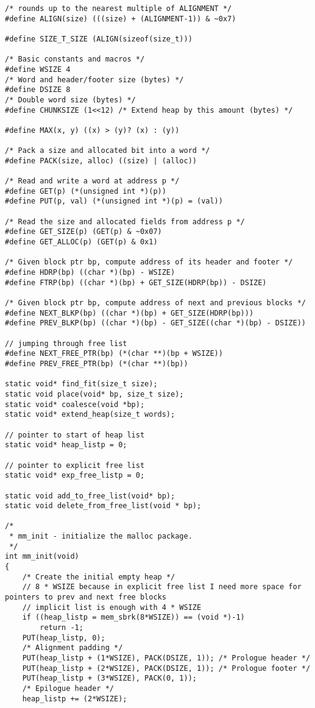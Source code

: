 \documentclass[a4paper]{article}
\begin{document}
\begin{lstlisting}
/* rounds up to the nearest multiple of ALIGNMENT */
#define ALIGN(size) (((size) + (ALIGNMENT-1)) & ~0x7)

#define SIZE_T_SIZE (ALIGN(sizeof(size_t)))

/* Basic constants and macros */
#define WSIZE 4
/* Word and header/footer size (bytes) */
#define DSIZE 8
/* Double word size (bytes) */
#define CHUNKSIZE (1<<12) /* Extend heap by this amount (bytes) */

#define MAX(x, y) ((x) > (y)? (x) : (y))

/* Pack a size and allocated bit into a word */
#define PACK(size, alloc) ((size) | (alloc))

/* Read and write a word at address p */
#define GET(p) (*(unsigned int *)(p))
#define PUT(p, val) (*(unsigned int *)(p) = (val))

/* Read the size and allocated fields from address p */
#define GET_SIZE(p) (GET(p) & ~0x07)
#define GET_ALLOC(p) (GET(p) & 0x1)

/* Given block ptr bp, compute address of its header and footer */
#define HDRP(bp) ((char *)(bp) - WSIZE)
#define FTRP(bp) ((char *)(bp) + GET_SIZE(HDRP(bp)) - DSIZE)

/* Given block ptr bp, compute address of next and previous blocks */
#define NEXT_BLKP(bp) ((char *)(bp) + GET_SIZE(HDRP(bp)))
#define PREV_BLKP(bp) ((char *)(bp) - GET_SIZE((char *)(bp) - DSIZE))

// jumping through free list
#define NEXT_FREE_PTR(bp) (*(char **)(bp + WSIZE))
#define PREV_FREE_PTR(bp) (*(char **)(bp))

static void* find_fit(size_t size);
static void place(void* bp, size_t size);
static void* coalesce(void *bp);
static void* extend_heap(size_t words);

// pointer to start of heap list
static void* heap_listp = 0;

// pointer to explicit free list
static void* exp_free_listp = 0;

static void add_to_free_list(void* bp);
static void delete_from_free_list(void * bp);

/*
 * mm_init - initialize the malloc package.
 */
int mm_init(void)
{
	/* Create the initial empty heap */
	// 8 * WSIZE because in explicit free list I need more space for pointers to prev and next free blocks
	// implicit list is enough with 4 * WSIZE
	if ((heap_listp = mem_sbrk(8*WSIZE)) == (void *)-1)
		return -1;
	PUT(heap_listp, 0);
	/* Alignment padding */
	PUT(heap_listp + (1*WSIZE), PACK(DSIZE, 1)); /* Prologue header */
	PUT(heap_listp + (2*WSIZE), PACK(DSIZE, 1)); /* Prologue footer */
	PUT(heap_listp + (3*WSIZE), PACK(0, 1));
	/* Epilogue header */
	heap_listp += (2*WSIZE);


\end{lstlisting}
\end{document}
